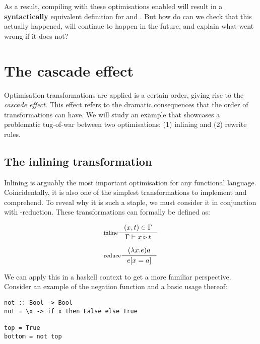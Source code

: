As a result, compiling with these optimisations enabled will result in a \textbf{syntactically} equivalent
definition for  and . But how do can we check that this actually happened,
will continue to happen in the future, and explain what went wrong if it does not?

\section{The cascade effect}

Optimisation transformations are applied is a certain order, giving rise to the \textit{cascade effect}. \cite{haskell_optimisations_1997}
This effect refers to the dramatic consequences that the order of transformations can have. We will study an example that
showcases a problematic tug-of-war between two optimisations: (1) inlining and (2) rewrite rules.

\subsection{The inlining transformation}

Inlining is arguably the most important optimisation for any functional language. Coincidentally,
it is also one of the simplest transformations to implement and comprehend. To reveal
why it is such a staple, we must consider it in conjunction with \textbeta-reduction. 
These transformations can formally be defined as:

\begin{multicols}{2}
  \begin{equation}
    \inference[inline]{(x,t) \in \Gamma}{\Gamma \vdash x \triangleright t}
  \end{equation}
  \break

  \begin{equation}
  \inference[reduce]{(\lambda x. e) a}{e[x = a]}
  \end{equation}
\end{multicols}

We can apply this in a haskell context to get a more familiar perspective. 
Consider an example of the negation function  and a basic usage thereof:

\begin{listing}[H]
\begin{verbatim}
not :: Bool -> Bool
not = \x -> if x then False else True

top = True
bottom = not top
\end{verbatim}
\end{listing}

